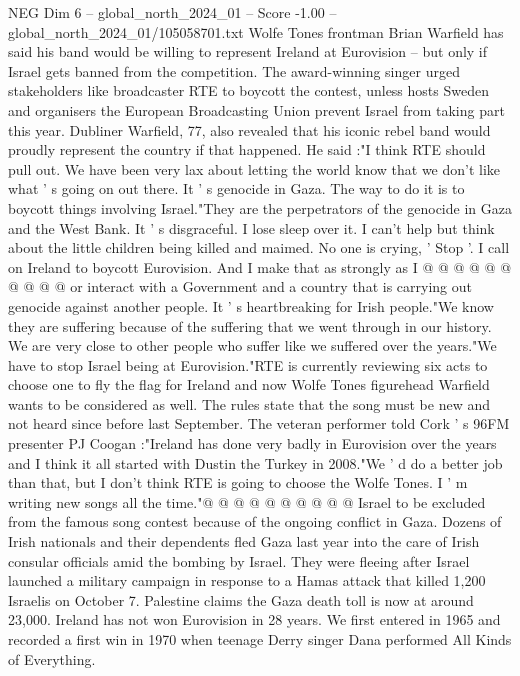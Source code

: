 \begin{textsample}{NEG Dim 6 – global\_north\_2024\_01 – Score -1.00 – global\_north\_2024\_01/105058701.txt}  \label{ex:f6_neg_327}
Wolfe Tones frontman Brian Warfield has said his band would be willing to represent Ireland at Eurovision -- but only if Israel gets banned from the competition.
The award-winning singer urged stakeholders like broadcaster RTE to boycott the contest, unless hosts Sweden and organisers the European Broadcasting Union prevent Israel from taking part this year.
Dubliner Warfield, 77, also revealed that his iconic rebel band would proudly represent the country if that happened.
He said :"I think RTE should pull out.
We have been very lax about letting the world know that we don't like what ' s going on out there.
It ' s genocide in Gaza.
The way to do it is to boycott things involving Israel."They are the perpetrators of the genocide in Gaza and the West Bank.
It ' s disgraceful.
I lose sleep over it.
I can't help but think about the little children being killed and maimed.
No one is crying, ' Stop '.
I call on Ireland to boycott Eurovision.
And I make that as strongly as I @ @ @ @ @ @ @ @ @ @ or interact with a Government and a country that is carrying out genocide against another people.
It ' s heartbreaking for Irish people."We know they are suffering because of the suffering that we went through in our history.
We are very close to other people who suffer like we suffered over the years."We have to stop Israel being at Eurovision."RTE is currently reviewing six acts to choose one to fly the flag for Ireland and now Wolfe Tones figurehead Warfield wants to be considered as well.
The rules state that the song must be new and not heard since before last September.
The veteran performer told Cork ' s 96FM presenter PJ Coogan :"Ireland has done very badly in Eurovision over the years and I think it all started with Dustin the Turkey in 2008."We ' d do a better job than that, but I don't think RTE is going to choose the Wolfe Tones.
I ' m writing new songs all the time."@ @ @ @ @ @ @ @ @ @ Israel to be excluded from the famous song contest because of the ongoing conflict in Gaza.
Dozens of Irish nationals and their dependents fled Gaza last year into the care of Irish consular officials amid the bombing by Israel.
They were fleeing after Israel launched a military campaign in response to a Hamas attack that killed 1,200 Israelis on October 7.
Palestine claims the Gaza death toll is now at around 23,000.
Ireland has not won Eurovision in 28 years.
We first entered in 1965 and recorded a first win in 1970 when teenage Derry singer Dana performed All Kinds of Everything.

\end{textsample}
